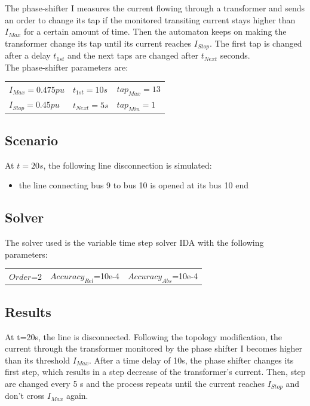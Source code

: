 \documentclass[a4paper, 12pt]{report}
\begin{document}
The phase-shifter I measures the current flowing through a transformer and sends an order to change its tap if the monitored transiting current stays higher than $I_{Max}$ for a certain amount of time. Then the automaton keeps on making the transformer change its tap until its current reaches $I_{Stop}$. The first tap is changed after a delay $t_{1st}$ and the next taps are changed after $t_{Next}$ seconds. \\

The phase-shifter parameters are:
\begin{center}
\begin{tabular}{l|l|l}
   $I_{Max}=0.475pu$ & $t_{1st}=10s$ & $tap_{Max}=13$ \\
   $I_{Stop}=0.45pu$  & $t_{Next}=5s$ & $tap_{Min}=1$ \\
\end{tabular}
\end{center}

\subsection{Scenario}
At $t=20s$, the following line disconnection is simulated:
\begin{itemize}
\item{the line connecting bus 9 to bus 10 is opened at its bus 10 end}
\end{itemize}

\subsection{Solver}
The solver used is the variable time step solver IDA with the following parameters:
\begin{center}
\begin{tabular}{l|l|l}
   $Order$=2 & $Accuracy_{Rel}$=10e-4 & $Accuracy_{Abs}$=10e-4 \\
\end{tabular}
\end{center}

\newpage
\subsection{Results}

At t=20s, the line is disconnected. Following the topology modification, the current through the transformer monitored by the phase shifter I becomes higher than its threshold $I_{Max}$. After a time delay of 10s, the phase shifter changes its first step, which results in a step decrease of the transformer's current. Then, step are changed every 5 s and the process repeats until the current reaches $I_{Stop}$ and don't cross $I_{Max}$ again. \\
\end{document}
